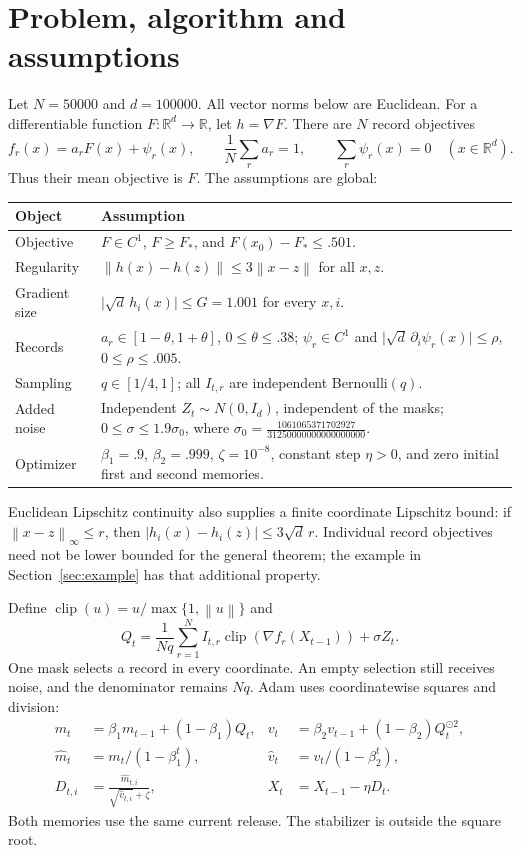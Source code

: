 \documentclass[11pt]{article}
\newcommand{\R}{\mathbb R}
\newcommand{\norm}[1]{\left\|#1\right\|}
\newcommand{\clip}{\operatorname{clip}}
\begin{document}
\section{Problem, algorithm and assumptions}
Let $N=50000$ and $d=100000$. All vector norms below are Euclidean.
For a differentiable function $F:\R^d\to\R$, let $h=\nabla F$.
There are $N$ record objectives
\[
 f_r(x)=a_r F(x)+\psi_r(x),\qquad
 \frac1N\sum_r a_r=1,\qquad \sum_r\psi_r(x)=0\quad(x\in\R^d).
\]
Thus their mean objective is $F$. The assumptions are global:
\begin{center}
\begin{tabular}{p{.24\linewidth}p{.67\linewidth}}
\toprule
Object & Assumption\\
\midrule
Objective & $F\in C^1$, $F\ge F_*$, and $F(x_0)-F_*\le .501$.\\
Regularity & $\norm{h(x)-h(z)}\le3\norm{x-z}$ for all $x,z$.\\
Gradient size & $\lvert\sqrt d\,h_i(x)\rvert\le G=1.001$ for every $x,i$.\\
Records & $a_r\in[1-\theta,1+\theta]$, $0\le\theta\le .38$;
$\psi_r\in C^1$ and
$\lvert\sqrt d\,\partial_i\psi_r(x)\rvert\le\rho$, $0\le\rho\le .005$.\\
Sampling & $q\in[1/4,1]$; all $I_{t,r}$ are independent Bernoulli$(q)$.\\
Added noise & Independent $Z_t\sim N(0,I_d)$, independent of the masks;
$0\le\sigma\le1.9\sigma_0$, where
$\displaystyle\sigma_0=\frac{1061065371702927}{31250000000000000000}$.\\
Optimizer & $\beta_1=.9$, $\beta_2=.999$, $\zeta=10^{-8}$, constant step
$\eta>0$, and zero initial first and second memories.\\
\bottomrule
\end{tabular}
\end{center}
Euclidean Lipschitz continuity also supplies a finite coordinate Lipschitz
bound: if $\norm{x-z}_\infty\le r$, then
$\lvert h_i(x)-h_i(z)\rvert\le3\sqrt d\,r$.
Individual record objectives need not be lower bounded for the general
theorem; the example in Section~\ref{sec:example} has that additional property.

Define $\clip(u)=u/\max\{1,\norm u\}$ and
\begin{equation}\label{eq:release}
 Q_t=\frac1{Nq}\sum_{r=1}^N I_{t,r}\clip(\nabla f_r(X_{t-1}))
           +\sigma Z_t .
\end{equation}
One mask selects a record in every coordinate. An empty selection still
receives noise, and the denominator remains $Nq$.
Adam uses coordinatewise squares and division:
\begin{align}
 m_t&=\beta_1m_{t-1}+(1-\beta_1)Q_t,&
 v_t&=\beta_2v_{t-1}+(1-\beta_2)Q_t^{\odot2},\nonumber\\
 \widehat m_t&=m_t/(1-\beta_1^t),&
 \widehat v_t&=v_t/(1-\beta_2^t),\nonumber\\
 D_{t,i}&=\frac{\widehat m_{t,i}}{\sqrt{\widehat v_{t,i}}+\zeta},&
 X_t&=X_{t-1}-\eta D_t .\label{eq:adam}
\end{align}
Both memories use the same current release. The stabilizer is outside the
square root.
\end{document}
